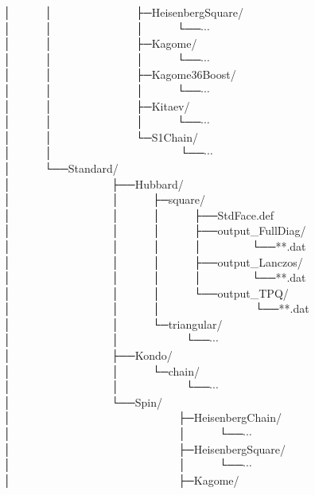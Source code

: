 │~~~~~~│~~~~~~~~~~~~~~~├─HeisenbergSquare/\\
│~~~~~~│~~~~~~~~~~~~~~~│~~~~~~└──$\cdots$\\
│~~~~~~│~~~~~~~~~~~~~~~├─Kagome/\\
│~~~~~~│~~~~~~~~~~~~~~~│~~~~~~└──$\cdots$\\
│~~~~~~│~~~~~~~~~~~~~~~├─Kagome36Boost/\\
│~~~~~~│~~~~~~~~~~~~~~~│~~~~~~└──$\cdots$\\
│~~~~~~│~~~~~~~~~~~~~~~├─Kitaev/\\
│~~~~~~│~~~~~~~~~~~~~~~│~~~~~~└──$\cdots$\\
│~~~~~~│~~~~~~~~~~~~~~~└─S1Chain/\\
│~~~~~~│~~~~~~~~~~~~~~~~~~~~~~~└──$\cdots$\\
│~~~~~~└──Standard/\\
│~~~~~~~~~~~~~~~~~~├──Hubbard/\\
│~~~~~~~~~~~~~~~~~~│~~~~~~├─square/\\
│~~~~~~~~~~~~~~~~~~│~~~~~~│~~~~~~├──StdFace.def\\
│~~~~~~~~~~~~~~~~~~│~~~~~~│~~~~~~├──output\_FullDiag/\\
│~~~~~~~~~~~~~~~~~~│~~~~~~│~~~~~~│~~~~~~~~~└──**.dat\\
│~~~~~~~~~~~~~~~~~~│~~~~~~│~~~~~~├──output\_Lanczos/\\
│~~~~~~~~~~~~~~~~~~│~~~~~~│~~~~~~│~~~~~~~~~└──**.dat\\
│~~~~~~~~~~~~~~~~~~│~~~~~~│~~~~~~└──output\_TPQ/\\
│~~~~~~~~~~~~~~~~~~│~~~~~~│~~~~~~~~~~~~~~~~~└──**.dat\\
│~~~~~~~~~~~~~~~~~~│~~~~~~└─triangular/\\
│~~~~~~~~~~~~~~~~~~│~~~~~~~~~~~~└──$\cdots$\\
│~~~~~~~~~~~~~~~~~~├──Kondo/\\
│~~~~~~~~~~~~~~~~~~│~~~~~~└─chain/\\
│~~~~~~~~~~~~~~~~~~│~~~~~~~~~~~~└──$\cdots$\\
│~~~~~~~~~~~~~~~~~~└──Spin/\\
│~~~~~~~~~~~~~~~~~~~~~~~~~~~~~~├─HeisenbergChain/\\
│~~~~~~~~~~~~~~~~~~~~~~~~~~~~~~│~~~~~~└──$\cdots$\\
│~~~~~~~~~~~~~~~~~~~~~~~~~~~~~~├─HeisenbergSquare/\\
│~~~~~~~~~~~~~~~~~~~~~~~~~~~~~~│~~~~~~└──$\cdots$\\
│~~~~~~~~~~~~~~~~~~~~~~~~~~~~~~├─Kagome/\\
